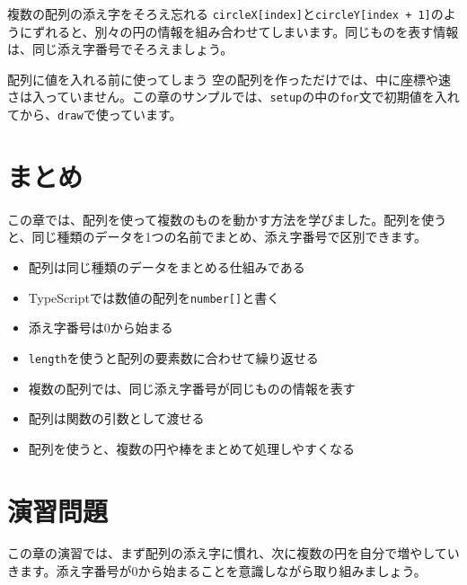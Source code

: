 \begin{mistakebox}{複数の配列の添え字をそろえ忘れる}
\texttt{circleX[index]}と\texttt{circleY[index + 1]}のようにずれると、別々の円の情報を組み合わせてしまいます。同じものを表す情報は、同じ添え字番号でそろえましょう。
\end{mistakebox}

\begin{mistakebox}{配列に値を入れる前に使ってしまう}
空の配列を作っただけでは、中に座標や速さは入っていません。この章のサンプルでは、\texttt{setup}の中の\texttt{for}文で初期値を入れてから、\texttt{draw}で使っています。
\end{mistakebox}

\section{まとめ}

この章では、配列を使って複数のものを動かす方法を学びました。配列を使うと、同じ種類のデータを1つの名前でまとめ、添え字番号で区別できます。

\begin{itemize}
    \item 配列は同じ種類のデータをまとめる仕組みである
    \item TypeScriptでは数値の配列を\texttt{number[]}と書く
    \item 添え字番号は0から始まる
    \item \texttt{length}を使うと配列の要素数に合わせて繰り返せる
    \item 複数の配列では、同じ添え字番号が同じものの情報を表す
    \item 配列は関数の引数として渡せる
    \item 配列を使うと、複数の円や棒をまとめて処理しやすくなる
\end{itemize}

\section{演習問題}

この章の演習では、まず配列の添え字に慣れ、次に複数の円を自分で増やしていきます。添え字番号が0から始まることを意識しながら取り組みましょう。

